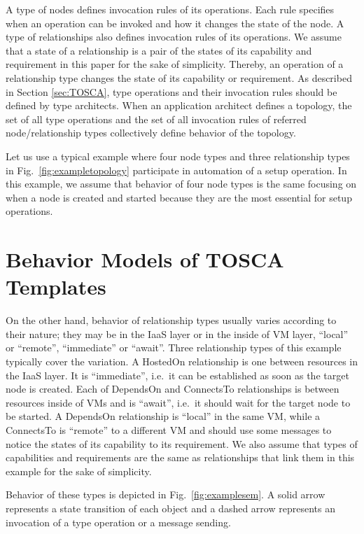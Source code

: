 \documentclass[12pt]{report}
\begin{document}
A type of nodes defines invocation rules of its operations. Each rule
specifies when an operation can be invoked and how it changes the
state of the node.  A type of relationships also defines invocation
rules of its operations. We assume that a state of a relationship is a
pair of the states of its capability and requirement in this paper for
the sake of simplicity. Thereby, an operation of a relationship type
changes the state of its capability or requirement.  As described in
Section \ref{sec:TOSCA}, type operations and their invocation rules
should be defined by type architects. When an application architect
defines a topology, the set of all type operations and the set of all
invocation rules of referred node/relationship types collectively
define behavior of the topology.

Let us use a typical example where four node types and three
relationship types in Fig.~\ref{fig:exampletopology} participate in
automation of a setup operation. In this example, we assume that
behavior of four node types is the same focusing on when a node is
created and started because they are the most essential for setup
operations.

\section{Behavior Models of TOSCA Templates}
\label{sec:TOSCAbehavior}
On the other hand, behavior of relationship types usually varies
according to their nature; they may be in the IaaS layer or in the
inside of VM layer, ``local'' or ``remote'', ``immediate'' or
``await''. Three relationship types of this example typically cover
the variation. A HostedOn relationship is one between resources in the
IaaS layer.  It is ``immediate'', i.e.\ it can be established as soon
as the target node is created.  Each of DependsOn and ConnectsTo
relationships is between resources inside of VMs and is ``await'',
i.e.\ it should wait for the target node to be started. A DependsOn
relationship is ``local'' in the same VM, while a ConnectsTo is
``remote'' to a different VM and should use some messages to notice
the states of its capability to its requirement.  We also assume that
types of capabilities and requirements are the same as relationships
that link them in this example for the sake of simplicity.

Behavior of these types is depicted in Fig.~\ref{fig:examplesem}.  A
solid arrow represents a state transition of each object and a dashed
arrow represents an invocation of a type operation or a message
sending.
\end{document}

